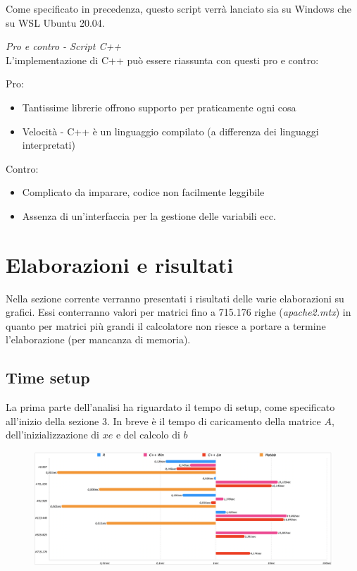 \documentclass[preprint,12pt]{elsarticle}
\begin{document}
Come specificato in precedenza, questo script verrà lanciato sia su Windows che su WSL Ubuntu 20.04.
\medskip


\textit{Pro e contro - Script C++}\\
\vspace{4mm}
L'implementazione di C++ può essere riassunta con questi pro e contro:

Pro:
\begin{itemize}
	\item Tantissime librerie offrono supporto per praticamente ogni cosa
	\item Velocità - C++ è un linguaggio compilato (a differenza dei linguaggi interpretati)
\end{itemize}

Contro:
\begin{itemize}
	\item Complicato da imparare, codice non facilmente leggibile
	\item Assenza di un'interfaccia per la gestione delle variabili ecc.
\end{itemize}

\newpage


\section{Elaborazioni e risultati}

Nella sezione corrente verranno presentati i risultati delle varie elaborazioni su grafici. Essi conterranno valori per matrici fino a 715.176 righe (\textit{apache2.mtx}) in quanto per matrici più grandi il calcolatore non riesce a portare a termine l'elaborazione (per mancanza di memoria).

\subsection{Time setup}
La prima parte dell'analisi ha riguardato il tempo di setup, come specificato all'inizio della sezione 3.
In breve è il tempo di caricamento della matrice $A$, dell'inizializzazione di $xe$ e del calcolo di $b$

\begin{figure}[H]
	\centering
	\includegraphics[width=\linewidth]{setup1}
\end{figure}
\end{document}
